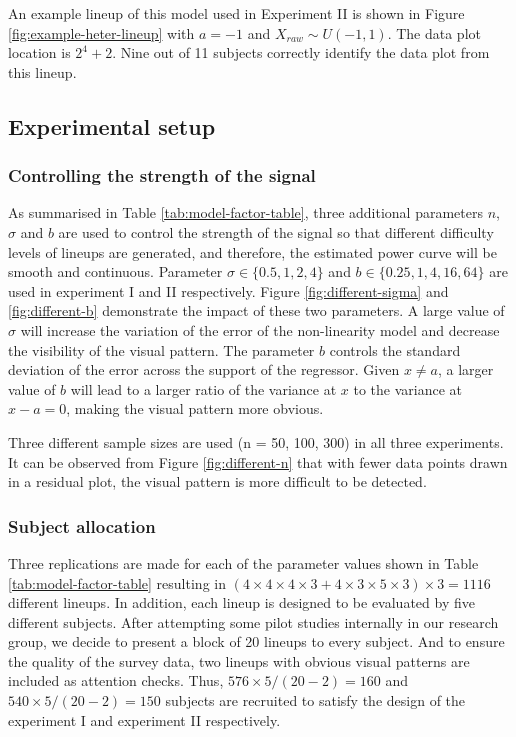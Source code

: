 \documentclass[]{interact}
\theoremstyle{plain}%
\theoremstyle{definition}
\theoremstyle{remark}
\begin{document}
An example lineup of this model used in Experiment II is shown in Figure
\ref{fig:example-heter-lineup} with \(a = -1\) and
\(X_{raw} \sim U(-1, 1)\). The data plot location is \(2^4 + 2\). Nine
out of 11 subjects correctly identify the data plot from this lineup.

\hypertarget{experimental-setup}{%
\subsection{Experimental setup}\label{experimental-setup}}

\hypertarget{controlling-the-strength-of-the-signal}{%
\subsubsection{Controlling the strength of the
signal}\label{controlling-the-strength-of-the-signal}}

As summarised in Table \ref{tab:model-factor-table}, three additional
parameters \(n\), \(\sigma\) and \(b\) are used to control the strength
of the signal so that different difficulty levels of lineups are
generated, and therefore, the estimated power curve will be smooth and
continuous. Parameter \(\sigma \in \{0.5, 1, 2, 4\}\) and
\(b \in \{0.25, 1, 4, 16, 64\}\) are used in experiment I and II
respectively. Figure \ref{fig:different-sigma} and \ref{fig:different-b}
demonstrate the impact of these two parameters. A large value of
\(\sigma\) will increase the variation of the error of the non-linearity
model and decrease the visibility of the visual pattern. The parameter
\(b\) controls the standard deviation of the error across the support of
the regressor. Given \(x \neq a\), a larger value of \(b\) will lead to
a larger ratio of the variance at \(x\) to the variance at
\(x - a = 0\), making the visual pattern more obvious.

Three different sample sizes are used (n = 50, 100, 300) in all three
experiments. It can be observed from Figure \ref{fig:different-n} that
with fewer data points drawn in a residual plot, the visual pattern is
more difficult to be detected.

\hypertarget{subject-allocation}{%
\subsubsection{Subject allocation}\label{subject-allocation}}

Three replications are made for each of the parameter values shown in
Table \ref{tab:model-factor-table} resulting in
\((4 \times 4 \times 4 \times 3 + 4 \times 3 \times 5 \times 3) \times 3 = 1116\)
different lineups. In addition, each lineup is designed to be evaluated
by five different subjects. After attempting some pilot studies
internally in our research group, we decide to present a block of 20
lineups to every subject. And to ensure the quality of the survey data,
two lineups with obvious visual patterns are included as attention
checks. Thus, \(576 \times 5 / (20-2) = 160\) and
\(540 \times 5 / (20-2) = 150\) subjects are recruited to satisfy the
design of the experiment I and experiment II respectively.
\end{document}
